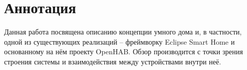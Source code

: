 \section{Аннотация}

Данная работа посвящена описанию концепции умного дома и, в частности, одной из существующих реализаций -- фреймворку Eclipse Smart Home и основанному на нём проекту OpenHAB.
Обзор производится с точки зрения строения системы и взаимодействия между устройствами внутри неё.
